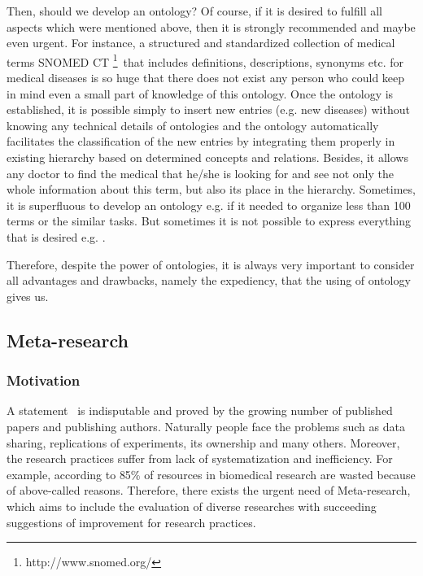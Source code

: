 		Then, should we develop an ontology? Of course, if it is desired to fulfill all aspects which were mentioned above, then it is strongly recommended and maybe even urgent. For instance, a structured and standardized collection of medical terms SNOMED CT \footnote{http://www.snomed.org/}\ that includes definitions, descriptions, synonyms etc. for medical diseases is so huge that there does not exist any person who could keep in mind even a small part of knowledge of this ontology. Once the ontology is established, it is possible simply to insert new entries (e.g. new diseases) without knowing any technical details of ontologies and the ontology automatically facilitates the classification of the new entries by integrating them properly in existing hierarchy based on determined concepts and relations. Besides, it allows any doctor to find the medical that he/she is looking for and see not only the whole information about this term, but also its place in the hierarchy. 
		Sometimes, it is superfluous to develop an ontology e.g. if it needed to organize less than 100 terms or the similar tasks. But sometimes it is not possible to express everything that is desired e.g. \frqq\cite{Fre12}.        
		
		Therefore, despite the power of ontologies, it is always very important to consider all advantages and drawbacks, namely the expediency, that the using of ontology gives us.  
	\subsection{Meta-research}
		\subsubsection{Motivation}
		A statement \frqq \ is indisputable and proved by the growing number of published papers and publishing authors\cite{Ioa14}. Naturally people face the problems such as data sharing, replications of experiments, its ownership and many others. Moreover, the research practices suffer from lack of systematization and inefficiency. For example, according to \cite{Mac14}  85\% of resources in biomedical research are wasted because of above-called reasons. Therefore, there exists the urgent need of Meta-research, which aims to include the evaluation of diverse researches with succeeding suggestions of improvement for research practices.    
		
